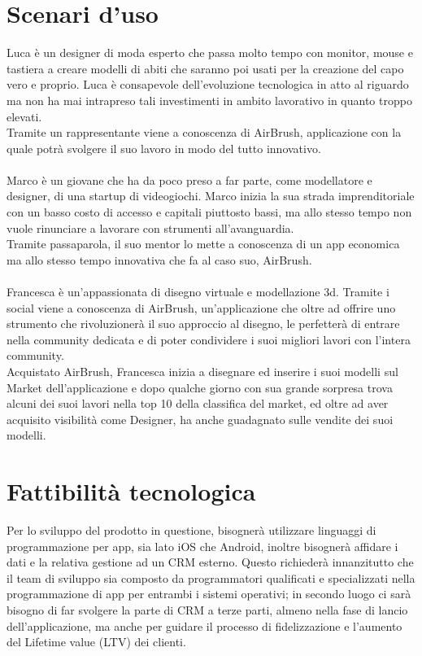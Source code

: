\documentclass[11pt,fleqn]{book} %
\begin{document}
\section{Scenari d'uso}
Luca è un designer di moda esperto che passa molto tempo con monitor, mouse e tastiera a creare modelli di abiti che saranno poi usati per la creazione del capo vero e proprio. Luca è consapevole dell’evoluzione tecnologica in atto al riguardo ma non ha mai intrapreso tali investimenti in ambito lavorativo in quanto troppo elevati. \\
Tramite un rappresentante viene a conoscenza di AirBrush, applicazione con la quale potrà svolgere il suo lavoro in modo del tutto innovativo.
\\\\
Marco è un giovane che ha da poco preso a far parte, come modellatore e designer, di una startup di videogiochi.
Marco inizia la sua strada imprenditoriale con un basso costo di accesso e capitali piuttosto bassi, ma allo stesso tempo non vuole rinunciare a lavorare con strumenti all'avanguardia. \\
Tramite passaparola, il suo mentor lo mette a conoscenza di un app economica ma allo stesso tempo innovativa che fa al caso suo, AirBrush.
\\\\
Francesca è un'appassionata di disegno virtuale e modellazione 3d. Tramite i social viene a conoscenza di AirBrush, un’applicazione che oltre ad offrire uno strumento che rivoluzionerà il suo approccio al disegno, le perfetterà di entrare nella community dedicata e di poter condividere i suoi migliori lavori con l'intera community. \\Acquistato AirBrush, Francesca inizia a disegnare ed inserire i suoi modelli sul Market dell'applicazione e dopo qualche giorno con sua grande sorpresa trova alcuni dei suoi lavori nella top 10 della classifica del market, ed oltre ad aver acquisito visibilità come Designer, ha anche guadagnato sulle vendite dei suoi modelli.


\newpage
\section{Fattibilità tecnologica}
Per lo sviluppo del prodotto in questione, bisognerà utilizzare linguaggi di programmazione per app, sia lato iOS che Android, inoltre bisognerà affidare i dati e la relativa gestione ad un CRM esterno. Questo richiederà innanzitutto che il team di sviluppo sia composto da programmatori qualificati e specializzati nella programmazione di app per entrambi i sistemi operativi;
 in secondo luogo ci sarà bisogno di far svolgere la parte di CRM a terze parti, almeno nella fase di lancio dell’applicazione, ma anche per guidare il processo di fidelizzazione e l'aumento del Lifetime value (LTV) dei clienti.
\end{document}
